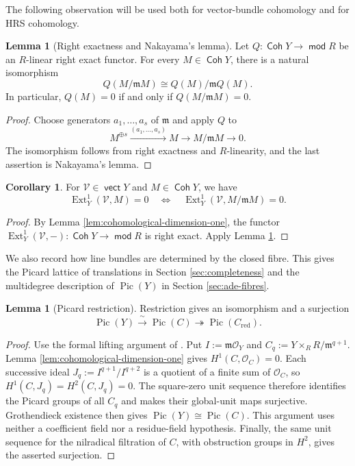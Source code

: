 \documentclass[a4paper,reqno]{amsart}
\def\O{\mathcal{O}}
\def\V{\mathcal{V}}
\def\m{\mathfrak{m}}
\DeclareMathOperator{\md}{\mathsf{mod}}
\renewcommand{\mod}{\md}
\DeclareMathOperator{\Coh}{\mathsf{Coh}}
\DeclareMathOperator{\vect}{\mathsf{vect}}
\DeclareMathOperator{\Ext}{Ext}
\DeclareMathOperator{\Pic}{Pic}
\theoremstyle{definition}
\newtheorem{Lem}[Thm]{Lemma}
\newtheorem{Cor}[Thm]{Corollary}
\begin{document}
The following observation will be used both for vector-bundle cohomology and for HRS cohomology.

\begin{Lem}[Right exactness and Nakayama's lemma]\label{lem:right-exact-nakayama}
Let $Q\colon\Coh Y\to\mod R$ be an $R$-linear right exact functor. For every $M\in\Coh Y$, there is a natural isomorphism
\[
Q(M/\m M)\cong Q(M)/\m Q(M).
\]
In particular, $Q(M)=0$ if and only if $Q(M/\m M)=0$.
\end{Lem}
\begin{proof}
Choose generators $a_1,\ldots,a_s$ of $\m$ and apply $Q$ to
\[
M^{\oplus s}\xrightarrow{(a_1,\ldots,a_s)}M\longrightarrow M/\m M\longrightarrow0.
\]
The isomorphism follows from right exactness and $R$-linearity, and the last assertion is Nakayama's lemma.
\end{proof}

\begin{Cor}\label{lem:closed-fibre-detects-ext}
For $\V\in\vect Y$ and $M\in\Coh Y$, we have
\[
\Ext_Y^1(\V,M)=0
\quad\Longleftrightarrow\quad
\Ext_Y^1(\V,M/\m M)=0.
\]
\end{Cor}
\begin{proof}
By Lemma \ref{lem:cohomological-dimension-one}, the functor $\Ext_Y^1(\V,-)\colon\Coh Y\to\mod R$ is right exact. Apply Lemma \ref{lem:right-exact-nakayama}.
\end{proof}

We also record how line bundles are determined by the closed fibre. This gives the Picard lattice of translations in Section \ref{sec:completeness} and the multidegree description of $\Pic(Y)$ in Section \ref{sec:ade-fibres}.

\begin{Lem}[Picard restriction]\label{lem:picard-restriction}
Restriction gives an isomorphism and a surjection
\[
\Pic(Y)\xrightarrow{\ \sim\ }\Pic(C)\twoheadrightarrow\Pic(C_{\mathrm{red}}).
\]
\end{Lem}
\begin{proof}
Use the formal lifting argument of \cite[proof of Lemma 3.4.3]{VdB04b}. Put $I:=\m\O_Y$ and $C_q:=Y\times_R R/\m^{q+1}$. Lemma \ref{lem:cohomological-dimension-one} gives $H^1(C,\O_C)=0$. Each successive ideal $J_q:=I^{q+1}/I^{q+2}$ is a quotient of a finite sum of $\O_C$, so $H^1(C,J_q)=H^2(C,J_q)=0$. The square-zero unit sequence \cite[Tag 0C6R]{stacks-project} therefore identifies the Picard groups of all $C_q$ and makes their global-unit maps surjective. Grothendieck existence \cite[Tag 088E]{stacks-project} then gives $\Pic(Y)\cong\Pic(C)$. This argument uses neither a coefficient field nor a residue-field hypothesis. Finally, the same unit sequence for the nilradical filtration of $C$, with obstruction groups in $H^2$, gives the asserted surjection.
\end{proof}
\end{document}
